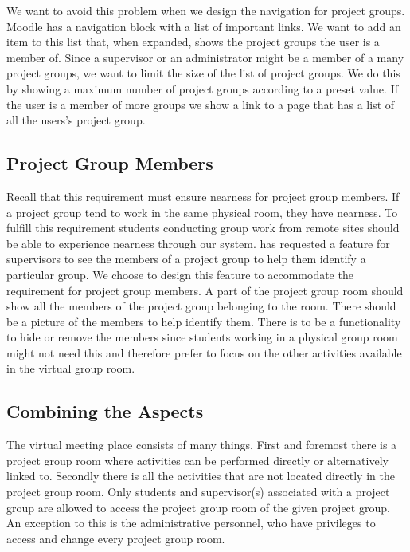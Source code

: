 We want to avoid this problem when we design the navigation for project groups.
Moodle has a navigation block with a list of important links.
We want to add an item to this list that, when expanded, shows the project groups the user is a member of.
Since a supervisor or an administrator might be a member of a many project groups, we want to limit the size of the list of project groups.
We do this by showing a maximum number of project groups according to a preset value.
If the user is a member of more groups we show a link to a page that has a list of all the users's project group.


\subsection{Project Group Members}
\label{sub:projGrpMembers}
Recall that this requirement must ensure nearness for project group members.
If a project group tend to work in the same physical room, they have nearness.
To fulfill this requirement students conducting group work from remote sites should be able to experience nearness through our system.
\supervisorgroup{} has requested a feature for supervisors to see the members of a project group to help them identify a particular group.
We choose to design this feature to accommodate the requirement for project group members.
A part of the project group room should show all the members of the project group belonging to the room.
There should be a picture of the members to help identify them.
There is to be a functionality to hide or remove the members since students working in a physical group room might not need this and therefore prefer to focus on the other activities available in the virtual group room.


\subsection{Combining the Aspects}
The virtual meeting place consists of many things.
First and foremost there is a project group room where activities can be performed directly or alternatively linked to.
Secondly there is all the activities that are not located directly in the project group room.
Only students and supervisor(s) associated with a project group are allowed to access the project group room of the given project group.
An exception to this is the administrative personnel, who have privileges to access and change every project group room.

